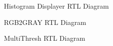 \documentclass[12pt]{article}
\begin{document}
  
    \begin{figure}[H]
    \caption{Histogram Displayer RTL Diagram}
    \label{fig:nomr_modhist}
  \end{figure}
  
      \begin{figure}[H]
    \caption{RGB2GRAY RTL Diagram}
    \label{fig:nomr_modhist}
  \end{figure}
  
        \begin{figure}[H]
    \caption{MultiThresh RTL Diagram}
    \label{fig:nomr_modhist}
  \end{figure}
  
  
  
\end{document}
